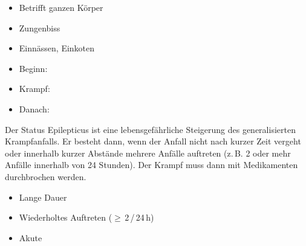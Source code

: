 {
\begin{itemize}
  \item Betrifft ganzen Körper
  \item Zungenbiss
  \item Einnässen, Einkoten
  \item Beginn:
  \item Krampf:
  \item Danach:
\end{itemize}

}
{}
{}
{}


{
Der Status Epilepticus ist eine
lebensgefährliche Steigerung
des generalisierten Krampfanfalls. Er besteht dann, wenn der
Anfall nicht nach kurzer Zeit vergeht oder innerhalb kurzer
Abstände mehrere Anfälle auftreten (z.\,B. 2 oder mehr Anfälle
innerhalb von 24 Stunden). Der Krampf muss dann mit Medikamenten
durchbrochen werden.
}
{
\begin{itemize}
  \item Lange Dauer
  \item Wiederholtes Auftreten ($\geq$\,2\,/\,24\,h)
  \item Akute 
\end{itemize}
}{}{}{}

\begin{Synopsis}
\end{Synopsis}



